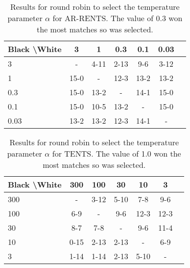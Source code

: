 \documentclass{article}
\theoremstyle{plain}
\begin{document}
\begin{appendices}
            \begin{table*}[]
            \centering
                \begin{tabular}{l|cccccc}
                    \textbf{Black \textbackslash White}     & 3  & 1   & 0.3   & 0.1    & 0.03    \\ 
                    \hline
                                            3            & -     	&  4-11 		&  2-13 		& 9-6  		& 3-12  		\\
                                            1            &  15-0 		& -     	&  12-3		& 13-2  		&   13-2		\\
                                            0.3          &  15-0  	&  13-2  	&   -   &  14-1 		&  15-0 		\\
                                            0.1          &  15-0 		&   10-5		&   13-2		& -     	&  15-0 		\\
                                            0.03         &  13-2 		&  13-2 		&  12-3 		&   	14-1	&   -   	\\    
                \end{tabular}
                \caption{Results for round robin to select the temperature parameter $\alpha$ for AR-RENTS. The value of 0.3 won the most matches so was selected. \label{tab:x050}}
            \end{table*}
            
            \begin{table*}[]
            \centering
                \begin{tabular}{l|cccccc}
                    \textbf{Black \textbackslash White}     & 300  & 100   & 30   & 10    & 3    \\ 
                    \hline
                                            300            & -     	&  3-12 		&  5-10 		&  7-8 		& 9-6  		\\
                                            100            &  6-9 		& -     	&  9-6		&  12-3 		& 12-3  		\\
                                            30          & 8-7   	&  7-8  	&   -   &  9-6 		&  11-4 		\\
                                            10          &  0-15 		&  2-13 		& 2-13  		& -     	& 6-9  		\\
                                            3         &  1-14 		& 1-14  		& 2-13  		&  5-10 		&   -   	\\    
                \end{tabular}
                \caption{Results for round robin to select the temperature parameter $\alpha$ for TENTS. The value of 1.0 won the most matches so was selected. \label{tab:w060}}
            \end{table*}
            

\end{appendices}
\end{document}
